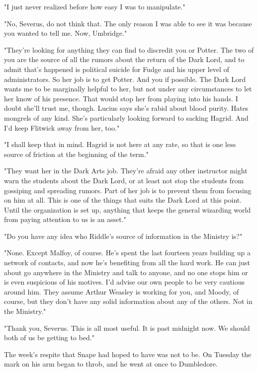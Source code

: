"I just never realized before how easy I was to manipulate."

"No, Severus, do not think that. The only reason I was able to see it was because you wanted to tell me. Now, Umbridge."

"They're looking for anything they can find to discredit you or Potter. The two of you are the source of all the rumors about the return of the Dark Lord, and to admit that's happened is political suicide for Fudge and his upper level of administrators. So her job is to get Potter. And you if possible. The Dark Lord wants me to be marginally helpful to her, but not under any circumstances to let her know of his presence. That would stop her from playing into his hands. I doubt she'll trust me, though. Lucius says she's rabid about blood purity. Hates mongrels of any kind. She's particularly looking forward to sacking Hagrid. And I'd keep Flitwick away from her, too."

"I shall keep that in mind. Hagrid is not here at any rate, so that is one less source of friction at the beginning of the term."

"They want her in the Dark Arts job. They're afraid any other instructor might warn the students about the Dark Lord, or at least not stop the students from gossiping and spreading rumors. Part of her job is to prevent them from focusing on him at all. This is one of the things that suits the Dark Lord at this point. Until the organization is set up, anything that keeps the general wizarding world from paying attention to us is an asset."

"Do you have any idea who Riddle's source of information in the Ministry is?"

"None. Except Malfoy, of course. He's spent the last fourteen years building up a network of contacts, and now he's benefiting from all the hard work. He can just about go anywhere in the Ministry and talk to anyone, and no one stops him or is even suspicious of his motives. I'd advise our own people to be very cautious around him. They assume Arthur Weasley is working for you, and Moody, of course, but they don't have any solid information about any of the others. Not in the Ministry."

"Thank you, Severus. This is all most useful. It is past midnight now. We should both of us be getting to bed."

The week's respite that Snape had hoped to have was not to be. On Tuesday the mark on his arm began to throb, and he went at once to Dumbledore.

